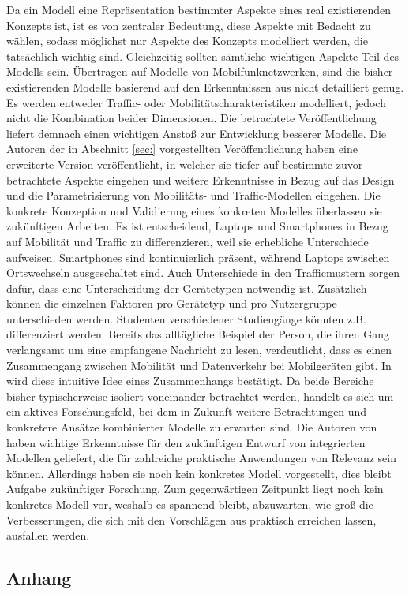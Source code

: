 \documentclass[12pt, a4paper]{article}
\begin{document}
Da ein Modell eine Repräsentation bestimmter Aspekte eines real existierenden Konzepts ist,
ist es von zentraler Bedeutung, diese Aspekte mit Bedacht zu wählen, sodass möglichst nur
Aspekte des Konzepts modelliert werden, die tatsächlich wichtig sind. Gleichzeitig sollten
sämtliche wichtigen Aspekte Teil des Modells sein.
Übertragen auf Modelle von Mobilfunknetzwerken, sind die bisher existierenden Modelle
basierend auf den Erkenntnissen aus \cite{Alipour2018} nicht detailliert genug. Es werden entweder
Traffic- oder Mobilitätscharakteristiken modelliert, jedoch nicht die Kombination beider Dimensionen.
Die betrachtete Veröffentlichung liefert demnach einen wichtigen Anstoß zur Entwicklung besserer Modelle.
\newline\newline
Die Autoren der in Abschnitt \ref{sec:} vorgestellten Veröffentlichung haben eine erweiterte Version veröffentlicht,
in welcher sie tiefer auf bestimmte zuvor betrachtete Aspekte eingehen und weitere Erkenntnisse in Bezug
auf das Design und die Parametrisierung von Mobilitäts- und Traffic-Modellen eingehen.
Die konkrete Konzeption und Validierung eines konkreten Modelles überlassen sie zukünftigen Arbeiten.
Es ist entscheidend, Laptops und Smartphones in Bezug auf Mobilität und Traffic zu differenzieren,
weil sie erhebliche Unterschiede aufweisen. Smartphones sind kontinuierlich präsent, während Laptops
zwischen Ortswechseln ausgeschaltet sind. Auch Unterschiede in den Trafficmustern sorgen dafür, dass
eine Unterscheidung der Gerätetypen notwendig ist. Zusätzlich können die einzelnen Faktoren
pro Gerätetyp und pro Nutzergruppe unterschieden werden. Studenten verschiedener Studiengänge könnten z.B.
differenziert werden.
\newline\newline
Bereits das alltägliche Beispiel der Person, die ihren Gang verlangsamt um eine empfangene Nachricht zu lesen,
verdeutlicht, dass es einen Zusammengang zwischen Mobilität und Datenverkehr bei Mobilgeräten gibt.
In \cite{Alipour2018} wird diese intuitive Idee eines Zusammenhangs bestätigt. Da beide Bereiche
bisher typischerweise isoliert voneinander betrachtet werden, handelt es sich um ein aktives Forschungsfeld,
bei dem in Zukunft weitere Betrachtungen und konkretere Ansätze kombinierter Modelle zu erwarten sind.
\newline\newline
Die Autoren von \cite{Alipour2018} haben wichtige Erkenntnisse für den zukünftigen Entwurf von integrierten Modellen
geliefert, die für zahlreiche praktische Anwendungen von Relevanz sein können. Allerdings haben sie noch kein konkretes
Modell vorgestellt, dies bleibt Aufgabe zukünftiger Forschung. Zum gegenwärtigen Zeitpunkt liegt noch kein konkretes Modell
vor, weshalb es spannend bleibt, abzuwarten, wie groß die Verbesserungen, die sich mit den Vorschlägen aus \cite{Alipour2018}
praktisch erreichen lassen, ausfallen werden.

\vfill
\pagebreak


%


\vfill
\pagebreak

\begin{appendix}
\section{Anhang}
\end{appendix}
\end{document}
